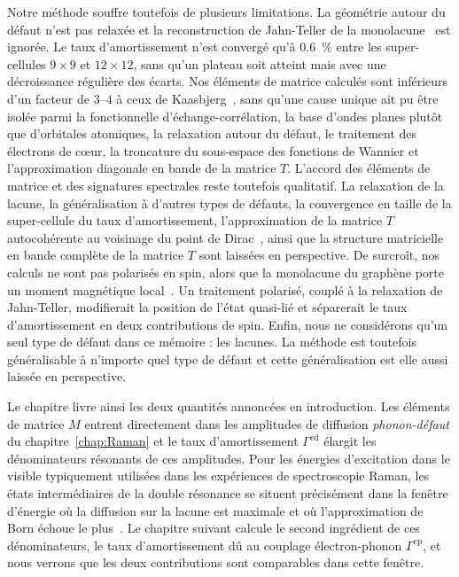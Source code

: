 Notre méthode souffre toutefois de plusieurs limitations. La géométrie autour du défaut n'est pas relaxée et la reconstruction de Jahn-Teller de la monolacune~\cite{el-barbaryStructureEnergeticsVacancy2003} est ignorée. Le taux d'amortissement n'est convergé qu'à $0.6$~\% entre les super-cellules $9\times 9$ et $12\times 12$, sans qu'un plateau soit atteint mais avec une décroissance régulière des écarts. Nos éléments de matrice calculés sont inférieurs d'un facteur de $3$--$4$ à ceux de Kaasbjerg~\cite{kaasbjergAtomisticMatrixTheory2020}, sans qu'une cause unique ait pu être isolée parmi la fonctionnelle d'échange-corrélation, la base d'ondes planes plutôt que d'orbitales atomiques, la relaxation autour du défaut, le traitement des électrons de cœur, la troncature du sous-espace des fonctions de Wannier et l'approximation diagonale en bande de la matrice $T$. L'accord des éléments de matrice et des signatures spectrales reste toutefois qualitatif. La relaxation de la lacune, la généralisation à d'autres types de défauts, la convergence en taille de la super-cellule du taux d'amortissement, l'approximation de la matrice $T$ autocohérente au voisinage du point de Dirac~\cite{peresElectronicPropertiesDisordered2006}, ainsi que la structure matricielle en bande complète de la matrice $T$ sont laissées en perspective. De surcroît, nos calculs ne sont pas polarisés en spin, alors que la monolacune du graphène porte un moment magnétique local~\cite{yazyevDefectinducedMagnetismGraphene2007}. Un traitement polarisé, couplé à la relaxation de Jahn-Teller, modifierait la position de l'état quasi-lié et séparerait le taux d'amortissement en deux contributions de spin. Enfin, nous ne considérons qu'un seul type de défaut dans ce mémoire : les lacunes. La méthode est toutefois généralisable à n'importe quel type de défaut et cette généralisation est elle aussi laissée en perspective.

Le chapitre livre ainsi les deux quantités annoncées en introduction. Les éléments de matrice $M$ entrent directement dans les amplitudes de diffusion \textit{phonon-défaut} du chapitre~\ref{chap:Raman} et le taux d'amortissement $\Gamma^\text{ed}$ élargit les dénominateurs résonants de ces amplitudes. Pour les énergies d'excitation dans le visible typiquement utilisées dans les expériences de spectroscopie Raman, les états intermédiaires de la double résonance se situent précisément dans la fenêtre d'énergie où la diffusion sur la lacune est maximale et où l'approximation de Born échoue le plus~\cite{thomsenDoubleResonantRaman2000}. Le chapitre suivant calcule le second ingrédient de ces dénominateurs, le taux d'amortissement dû au couplage électron-phonon $\Gamma^\text{ep}$, et nous verrons que les deux contributions sont comparables dans cette fenêtre.
